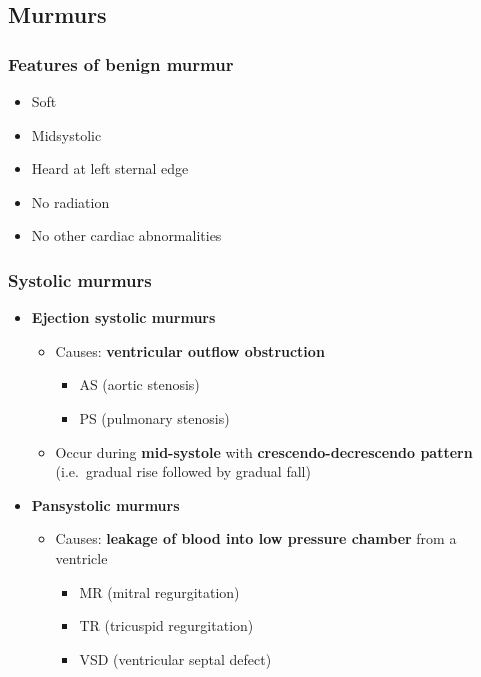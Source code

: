 \documentclass[
  12pt,
]{memoir}
\providecommand{\tightlist}{%
  \setlength{\itemsep}{0pt}\setlength{\parskip}{0pt}}
\begin{document}
\hypertarget{murmurs}{%
\subsection{Murmurs}\label{murmurs}}

\hypertarget{features-of-benign-murmur}{%
\subsubsection{Features of benign
murmur}\label{features-of-benign-murmur}}

\begin{itemize}
\tightlist
\item
  Soft
\item
  Midsystolic
\item
  Heard at left sternal edge
\item
  No radiation
\item
  No other cardiac abnormalities
\end{itemize}

\hypertarget{systolic-murmurs}{%
\subsubsection{Systolic murmurs}\label{systolic-murmurs}}

\begin{itemize}
\tightlist
\item
  \textbf{Ejection systolic murmurs}

  \begin{itemize}
  \tightlist
  \item
    Causes: \textbf{ventricular outflow obstruction}

    \begin{itemize}
    \tightlist
    \item
      AS (aortic stenosis)
    \item
      PS (pulmonary stenosis)
    \end{itemize}
  \item
    Occur during \textbf{mid-systole} with \textbf{crescendo-decrescendo
    pattern} (i.e.~gradual rise followed by gradual fall)
  \end{itemize}
\item
  \textbf{Pansystolic murmurs}

  \begin{itemize}
  \tightlist
  \item
    Causes: \textbf{leakage of blood into low pressure chamber} from a
    ventricle

    \begin{itemize}
    \tightlist
    \item
      MR (mitral regurgitation)
    \item
      TR (tricuspid regurgitation)
    \item
      VSD (ventricular septal defect)
    \end{itemize}
  \end{itemize}
\end{itemize}
\end{document}
